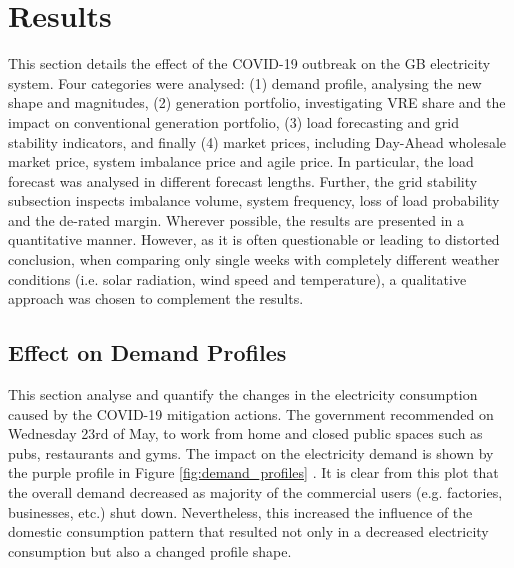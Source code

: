 \documentclass[energies,article,submit,moreauthors,pdftex]{Definitions/mdpi}
\begin{document}

\section{Results}
This section details the effect of the COVID-19 outbreak on the GB electricity system. Four categories were analysed: (1) demand profile, analysing the new shape and magnitudes, (2) generation portfolio, investigating VRE share and the impact on conventional generation portfolio, (3) load forecasting and grid stability indicators, and finally (4) market prices, including Day-Ahead wholesale market price, system imbalance price and agile price. In particular, the load forecast was analysed in different forecast lengths. Further, the grid stability subsection inspects imbalance volume, system frequency, loss of load probability and the de-rated margin. Wherever possible, the results are presented in a quantitative manner. However, as it is often questionable or leading to distorted conclusion, when comparing only single weeks with completely different weather conditions (i.e. solar radiation, wind speed and temperature), a qualitative approach was chosen to complement the results.


\subsection{Effect on Demand Profiles}\label{section: Effect on demand profile}

This section analyse and quantify the changes in the electricity consumption caused by the COVID-19 mitigation actions. The government recommended on Wednesday 23rd of May, to work from home and closed public spaces such as pubs, restaurants and gyms. The impact on the electricity demand is shown by the purple profile in Figure \ref{fig:demand_profiles} \cite{GovernmentGOV.UK}. It is clear from this plot that the overall demand decreased as majority of the commercial users (e.g. factories, businesses, etc.) shut down. Nevertheless, this increased the influence of the domestic consumption pattern that resulted not only in a decreased electricity consumption but also a changed profile shape.
\end{document}
